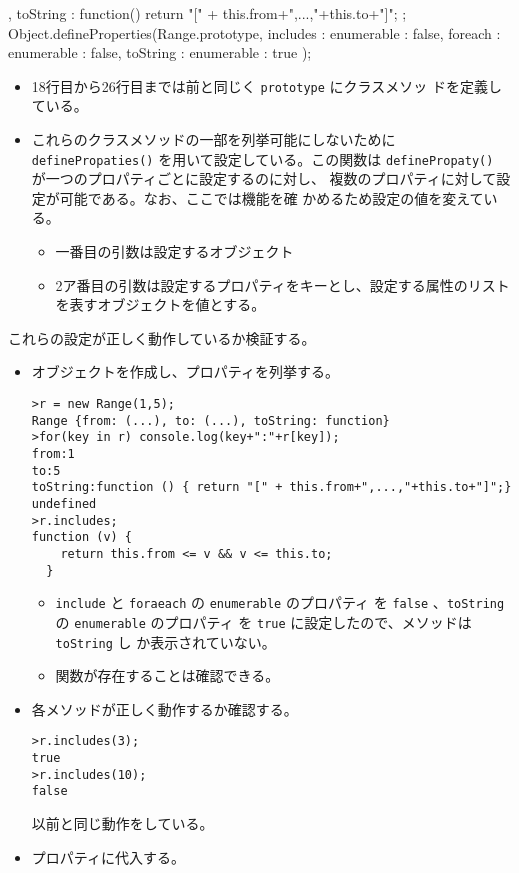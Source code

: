 \begin{Exec}
\begin{listingcont}
{{  },
  toString : function() { return "[" + this.from+",...,"+this.to+"]";}
};
Object.defineProperties(Range.prototype, 
  { includes : {enumerable : false},
    foreach  : {enumerable : false},
    toString : {enumerable : true}
  });
\end{listingcont}
\begin{itemize}
 \item 18行目から26行目までは前と同じく \texttt{prototype} にクラスメソッ
       ドを定義している。
 \item これらのクラスメソッドの一部を列挙可能にしないために
       \texttt{definePropaties()} を用いて設定している。この関数は
       \texttt{definePropaty()} が一つのプロパティごとに設定するのに対し、
       複数のプロパティに対して設定が可能である。なお、ここでは機能を確
       かめるため設定の値を変えている。
\begin{itemize}
 \item 一番目の引数は設定するオブジェクト
 \item 2ア番目の引数は設定するプロパティをキーとし、設定する属性のリスト
       を表すオブジェクトを値とする。
\end{itemize}
\end{itemize}
これらの設定が正しく動作しているか検証する。
\begin{itemize}
 \item オブジェクトを作成し、プロパティを列挙する。
\begin{Verbatim}
>r = new Range(1,5);
Range {from: (...), to: (...), toString: function}
>for(key in r) console.log(key+":"+r[key]);
from:1
to:5
toString:function () { return "[" + this.from+",...,"+this.to+"]";}
undefined
>r.includes;
function (v) {
    return this.from <= v && v <= this.to;
  } 
\end{Verbatim}
\begin{itemize}
 \item \texttt{include} と \texttt{foraeach} の \texttt{enumerable} のプロパティ
       を \texttt{false} 、\texttt{toString} の \texttt{enumerable} のプロパティ
       を \texttt{true} に設定したので、メソッドは \texttt{toString} し
       か表示されていない。
 \item 関数が存在することは確認できる。
\end{itemize}
 \item 各メソッドが正しく動作するか確認する。
\begin{Verbatim}
>r.includes(3);
true
>r.includes(10);
false
\end{Verbatim}
以前と同じ動作をしている。
 \item プロパティに代入する。

\end{itemize}
\end{Exec}
